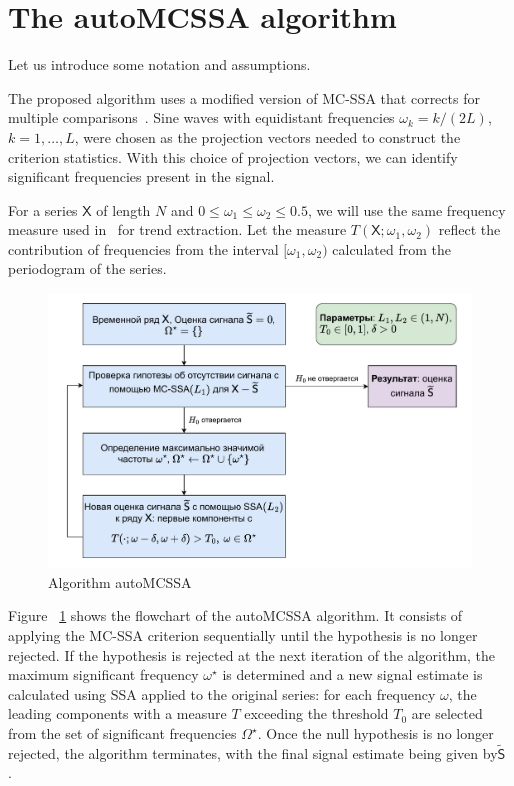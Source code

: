 \documentclass[12pt]{article}
\begin{document}
\section{The autoMCSSA algorithm}
Let us introduce some notation and assumptions.

The proposed algorithm uses a modified version of MC-SSA that corrects for multiple comparisons~\cite{Golyandina2023}. Sine waves with equidistant frequencies $\omega_k=k/(2L)$, $k=1,\ldots,L$, were chosen as the projection vectors needed to construct the criterion statistics. With this choice of projection vectors, we can identify significant frequencies present in the signal.

For a series $\mathsf{X}$ of length $N$ and $0\leqslant\omega_1\leqslant\omega_2\leqslant0.5$, we will use the same frequency measure used in~\cite{alexandrov} for trend extraction.
Let the measure $T(\mathsf{X};\omega_1,\omega_2)$ reflect the contribution of frequencies from the interval $[\omega_1,\omega_2)$ calculated from the periodogram of the series.

\begin{figure}[htbp]
    \centering
    \includegraphics[width=\textwidth]{img/auto_mcssa_alg.pdf}
    \caption{Algorithm autoMCSSA}
    \label{fig:autoMCSSA_alg}
\end{figure}

Figure ~\ref{fig:autoMCSSA_alg} shows the flowchart of the autoMCSSA algorithm. It consists of applying the MC-SSA criterion sequentially until the hypothesis is no longer rejected. If the hypothesis is rejected at the next iteration of the algorithm, the maximum significant frequency $\omega^\star$ is determined and a new signal estimate is calculated using SSA applied to the original series: for each frequency $\omega$, the leading components with a measure $T$ exceeding the threshold $T_0$ are selected from the set of significant frequencies $\Omega^\star$. Once the null hypothesis is no longer rejected, the algorithm terminates, with the final signal estimate being given by$\widetilde{\mathsf{S}}$ .
\end{document}
